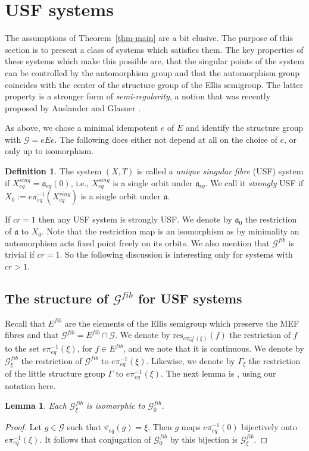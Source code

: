 \documentclass[12pt]{amsart}
\newtheorem{lemma}[theorem]{Lemma}
\theoremstyle{definition}
\newtheorem{definition}[theorem]{Definition}
\numberwithin{equation}{section}
\newcommand{\Gg}{{\mathcal G}}
\newcommand{\Xe}{X_{eq}}
\newcommand{\aut}{{\mathfrak a}}
\newcommand{\aute}{\aut_{eq}}
\newcommand{\pe}{\pi_{eq}}
\newcommand{\tpe}{\widetilde{\pe}}
\newcommand{\Ef}{E^{fib}}
\newcommand{\res}{\mathrm{res}}
\newcommand{\Gf}{\Gg^{fib}}
\begin{document}


\section{USF systems}\label{sec:USF-systems} 
The assumptions of Theorem~\ref{thm-main} are a bit elusive.    
The purpose of this section is to present a class of systems which satisfies them. The key properties of these systems which make this possible are, that the singular points of the system can be controlled by the automorphism group and that the automorphism group coincides with the center of the structure group of the Ellis semigroup. The latter property is a stronger form of {\em semi-regularity}, a notion that was recently proposed by Auslander and Glasner \cite{AG}.

As above, we chose a minimal idempotent $e$ of $E$ and identify the structure group with $\Gg=eEe$.
 The following does either not depend at all on the choice of $e$, or only up to isomorphism. 
\begin{definition} The system
 $(X,T)$ is called a \emph{unique singular fibre} (USF) system if  $\Xe^{sing}=\aute(0)$, i.e., $\Xe^{sing}$ is a single orbit under $\aute$. We call it \emph{strongly} USF if 
$X_0:=e\pe^{-1}(\Xe^{sing})$ is a single orbit under $\aut$. 
\end{definition}
If $cr=1$ then any USF system is strongly USF. 
We denote by $\aut_0$ the restriction of $\aut$ to $X_0$. Note that the restriction map is an isomorphism as by minimality an automorphism acts fixed point freely on its orbits. We also mention that $\Gg^{fib}$ is trivial if $cr=1$. So the following discussion is interesting only for systems with $cr>1$.

\subsection{The structure of $\Gg^{fib}$ for USF systems}
Recall that $\Ef$ are the elements of the Ellis semigroup which preserve the MEF fibres and that $\Gf = \Ef\cap \Gg $. We denote by 
 $\res_{e\pe^{-1}(\xi) }(f)$ the restriction of $f$ to the set $e\pe^{-1}(\xi)$,  for $f\in \Ef$, and we note that it is continuous.
We denote by  $\Gf_\xi$ the restriction of $\Gf$ to $e\pe^{-1}(\xi)$.
Likewise, we denote by $\Gamma_\xi$ the restriction of the little structure group $\Gamma$ to $e\pe^{-1}(\xi)$. The next lemma is \cite[Lemma 3.3]{ESBS}, using our notation here.
 \begin{lemma}
Each $\Gg^{fib}_\xi$ is isomorphic to $\Gf_0$.
\end{lemma}
\begin{proof}
Let $g\in \Gg$ such that $ \tpe(g) =\xi$. Then $g$ maps $e\pe^{-1}(0)$ bijectively onto $e\pe^{-1}(\xi)$. It follows that conjugation of $\Gg^{fib}_0$ by this bijection is $\Gg^{fib}_\xi$.
\end{proof}
\end{document}
